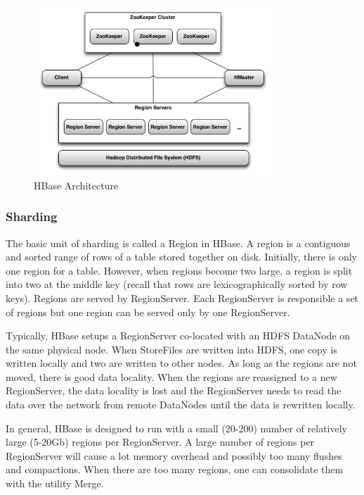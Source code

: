 \documentclass[11pt]{book}
\begin{document}
\begin{figure}[t]
\includegraphics[width=0.8\textwidth]{images/hbase-architecture.png}
\centering
\caption{HBase Architecture}
\end{figure}

\subsubsection{Sharding}

The basic unit of sharding is called a Region in HBase. A region is a contiguous and sorted range of rows of a table stored together on disk. Initially, there is only one region for a table. However, when regions become two large, a region is split into two at the middle key (recall that rows are lexicographically sorted by row keys). Regions are served by RegionServer. Each RegionServer is responsible a set of regions but one region can be served only by one RegionServer.

Typically, HBase setups a RegionServer co-located with an HDFS DataNode on the same physical node. When StoreFiles are written into HDFS, one copy is written locally and two are written to other nodes. As long as the regions are not moved, there is good data locality. When the regions are reassigned to a new RegionServer, the data locality is lost and the RegionServer needs to read the data over the network from remote DataNodes until the data is rewritten locally.

In general, HBase is designed to run with a small (20-200) number of relatively large (5-20Gb) regions per RegionServer. A large number of regions per RegionServer will cause a lot memory overhead and possibly too many flushes and compactions. When there are too many regions, one can consolidate them with the utility Merge.
\end{document}
